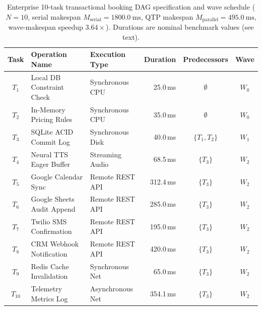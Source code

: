 \documentclass[review,12pt,times,authoryear]{elsarticle}
\theoremstyle{definition}
\begin{document}
\begin{table}[t]
\centering
\small
\setlength{\tabcolsep}{6pt}
\renewcommand{\arraystretch}{1.15}
\caption{Enterprise 10-task transactional booking DAG specification and wave schedule ($N=10$, serial makespan $M_{\text{serial}} = \SI{1800.0}{\milli\second}$, QTP makespan $M_{\text{parallel}} = \SI{495.0}{\milli\second}$, wave-makespan speedup $3.64\times$). Durations are nominal benchmark values (see text).}
\label{tab:task_dag}
\begin{tabularx}{\columnwidth}{@{}c X l r c c@{}}
\toprule
\textbf{Task} & \textbf{Operation Name} & \textbf{Execution Type} & \textbf{Duration} & \textbf{Predecessors} & \textbf{Wave} \\
\midrule
$T_1$ & Local DB Constraint Check  & Synchronous CPU & 25.0\,ms & $\emptyset$ & $W_0$ \\
$T_2$ & In-Memory Pricing Rules    & Synchronous CPU & 35.0\,ms & $\emptyset$ & $W_0$ \\
$T_3$ & SQLite ACID Commit Log     & Synchronous Disk & 40.0\,ms & $\{T_1, T_2\}$ & $W_1$ \\
$T_4$ & Neural TTS Eager Buffer    & Streaming Audio & 68.5\,ms & $\{T_3\}$ & $W_2$ \\
$T_5$ & Google Calendar Sync       & Remote REST API & 312.4\,ms & $\{T_3\}$ & $W_2$ \\
$T_6$ & Google Sheets Audit Append & Remote REST API & 285.0\,ms & $\{T_3\}$ & $W_2$ \\
$T_7$ & Twilio SMS Confirmation    & Remote REST API & 195.0\,ms & $\{T_3\}$ & $W_2$ \\
$T_8$ & CRM Webhook Notification   & Remote REST API & 420.0\,ms & $\{T_3\}$ & $W_2$ \\
$T_9$ & Redis Cache Invalidation   & Synchronous Net & 65.0\,ms & $\{T_3\}$ & $W_2$ \\
$T_{10}$ & Telemetry Metrics Log   & Asynchronous Net & 354.1\,ms & $\{T_3\}$ & $W_2$ \\
\bottomrule
\end{tabularx}
\end{table}
\end{document}
